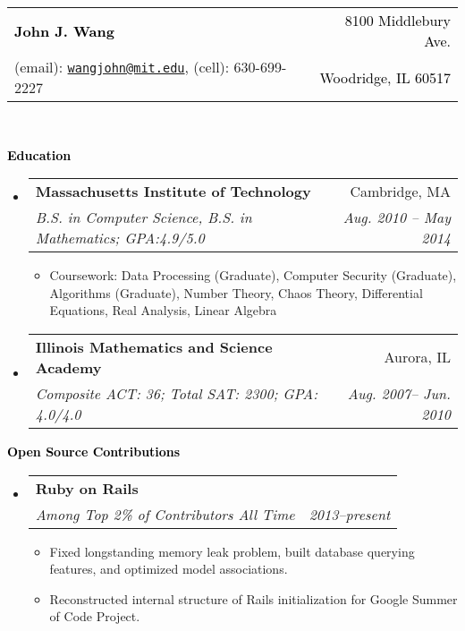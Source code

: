 \documentclass[letterpaper,11pt]{article}
\makeatletter
\newcommand{\resitem}[1]{\item #1 \vspace{-2pt}}
\newcommand{\resheading}[1]{{\large \colorbox{mygrey}{\begin{minipage}{\textwidth}{\textbf{ \textcolor{Black}{#1 \vphantom{p\^{E}}}}}\end{minipage}}}}
\newcommand{\ressubheading}[4]{
\begin{tabular*}{6.5in}{l@{\extracolsep{\fill}}r}
		\textbf{#1} & #2 \\
		\textit{#3} & \textit{#4} \\
\end{tabular*}\vspace{-6pt}}
\makeatother
\begin{document}
\newcommand{\myheader}{
\begin{tabular*}{7in}{l@{\extracolsep{\fill}}r}
	\textbf{\huge {\textcolor{Black}{John J. Wang}}} & \textcolor{Black}{8100 Middlebury Ave.}\\
	{\footnotesize (email): \texttt{{\href{mailto:wangjohn@mit.edu}{wangjohn@mit.edu}}},  (cell): 630-699-2227} & \textcolor{Black}{Woodridge, IL 60517} 
	\end{tabular*}
\\
\vspace{0.1in}}

\myheader

\resheading{Education}
	\begin{itemize}
		\item
			\ressubheading{Massachusetts Institute of Technology}{Cambridge, MA}{{B.S. in Computer Science, B.S. in Mathematics};{ GPA:4.9/5.0}}{Aug. 2010 -- May 2014}
				{ \footnotesize
				\begin{itemize}
					\resitem{Coursework: Data Processing (Graduate), Computer Security (Graduate), Algorithms (Graduate), Number Theory, Chaos Theory, Differential Equations,  Real Analysis, Linear Algebra}
				\end{itemize}
				}
		\item			
			\ressubheading{Illinois Mathematics and Science Academy}{Aurora, IL}{{Composite ACT: 36}; {Total SAT: 2300}; {GPA: 4.0/4.0}}{Aug. 2007-- Jun. 2010} {\footnotesize

				}
			
	\end{itemize} %

\resheading{Open Source Contributions}
	\begin{itemize}
		\item
			\ressubheading{Ruby on Rails}{}{{Among Top 2\% of Contributors All Time}}{2013--present}
			{\footnotesize
				\begin{itemize}
					\resitem {Fixed longstanding memory leak problem, built database querying features, and optimized model associations.}
					\resitem {Reconstructed internal structure of Rails initialization for Google Summer of Code Project.}
				\end{itemize}
			}
	\end{itemize}
\end{document}
